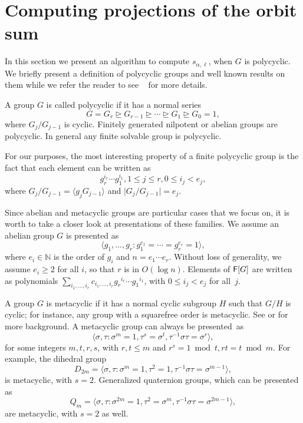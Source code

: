 \section{Computing projections of the orbit sum}
\label{sec:osum}

In this section we present an algorithm to compute $s_{\alpha,\ell}$,
when $G$ is polycyclic. We briefly present a definition of polycyclic 
groups and well known results on them while we refer the reader to
see ~\cite[Chapter 8]{HoEiOb05} for more details.

A group $G$ is called polycyclic if it has a normal series 
$$G = G_{r} \unrhd G_{r-1} \unrhd \cdots \unrhd G_1 \unrhd G_{0} = 1,$$
where $G_{j}/G_{j-1}$ is cyclic. Finitely generated nilpotent or 
abelian groups are polycyclic. In general any finite solvable group is 
polycyclic.

For our purposes, the most interesting property of a finite polycyclic 
group is the fact that each element can be written as 
\[\label{eq:polycyclicgrp}
g_r^{i_r} \cdots g_1^{i_1}, 1 \leq j \leq r, 0 \leq i_j < e_j,
\]
where $G_{j}/G_{j-1} = \langle g_{j}G_{j-1} \rangle$ and 
$\vert G_{j}/G_{j-1}\vert = e_j$.

Since abelian and metacyclic groups are particular cases that we focus on,
it is worth to take a closer look at presentations of these families.
We assume an abelian group $G$ is presented as 
\[ \label{eq:abeliangrp}
  \langle g_1, \ldots , g_r: g_{1}^{e_1} = \cdots = g_{r}^{e_r} = 1
  \rangle,
\]
where $ e_i \in \mathbb{N}$ is the order of $g_i$ and $n = e_1 \cdots
e_r$.  Without loss of generality, we assume $e_i \ge 2$ for all $i$,
so that $r$ is in $O(\log n)$. Elements of ${\mathsf{F}}[G]$ are written as
polynomials $\sum_{i_1,\dots,i_r} c_{i_1,\dots,i_r}
{g_r}^{i_r} \cdots {g_1}^{i_1}$, with $0\le i_j < e_j$ for all~$j$.

A group $G$ is metacyclic if it has a normal cyclic subgroup $H$ such that
$G/H$ is cyclic; for instance, any group with a squarefree order is
metacyclic. See \citep[p.~88]{Johnson} or \citep[p.~334]{Curtis} for more
background. A metacyclic group can always be presented~as
\begin{equation}
  \label{eq:metacyclic}
  \langle \sigma,\tau: \sigma^m = 1,  \tau^s = \sigma^t, \tau^{-1}\sigma \tau = \sigma^r \rangle,
\end{equation}
for some integers $m,t,r,s$, with $r,t \leq m$ and
$r^s = 1 \bmod t, rt = t \bmod m$. For example, the dihedral group
$$D_{2m} = \langle \sigma,\tau: \sigma^m =1, \tau^2 = 1, \tau^{-1}
\sigma \tau = \sigma^{m-1} \rangle, $$ is metacyclic, with
$s=2$. Generalized quaternion groups, which can be presented as
$$Q_m = \langle \sigma,\tau: \sigma^{2m} =1, \tau^2 = \sigma^m,
\tau^{-1} \sigma \tau = \sigma^{2m-1} \rangle,$$ are metacyclic, with
$s=2$ as well.


